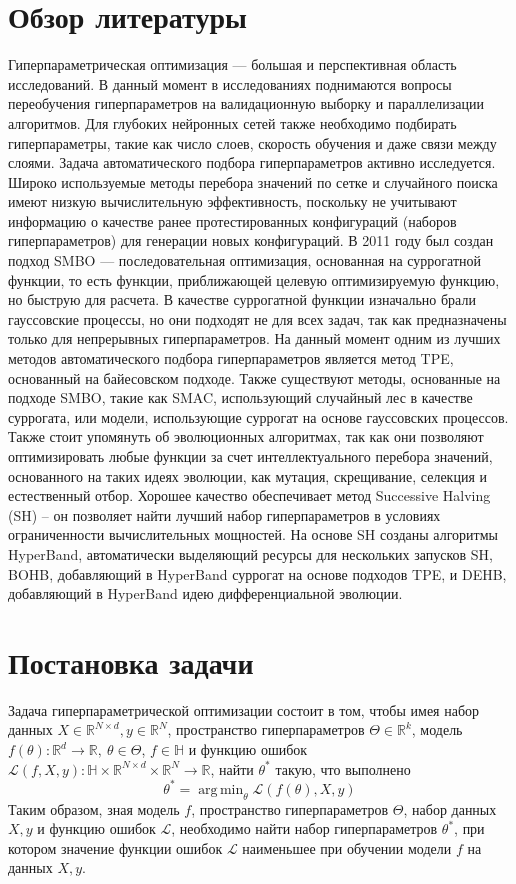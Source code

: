 \documentclass[a4paper,12pt]{article}
\DeclareMathOperator*{\argmin}{arg\,min}
\begin{document}
\section{Обзор литературы}

Гиперпараметрическая оптимизация — большая и перспективная область исследований. В данный момент в исследованиях поднимаются вопросы переобучения гиперпараметров на валидационную выборку и параллелизации алгоритмов. Для глубоких нейронных сетей также необходимо подбирать гиперпараметры, такие как число слоев, скорость обучения и даже связи между слоями.
Задача автоматического подбора гиперпараметров активно исследуется. Широко используемые методы перебора значений по сетке и случайного поиска имеют низкую вычислительную эффективность, поскольку не учитывают информацию о качестве ранее протестированных конфигураций (наборов гиперпараметров) для генерации новых конфигураций. В 2011 году был создан подход SMBO — последовательная оптимизация, основанная на суррогатной функции, то есть функции, приближающей целевую оптимизируемую функцию, но быструю для расчета. В качестве суррогатной функции изначально брали гауссовские процессы, но они подходят не для всех задач, так как предназначены только для непрерывных гиперпараметров. 
На данный момент одним из лучших методов автоматического подбора гиперпараметров является метод TPE, основанный на байесовском подходе. Также существуют методы, основанные на подходе SMBO, такие как SMAC, использующий случайный лес в качестве суррогата, или модели, использующие суррогат на основе гауссовских процессов. Также стоит упомянуть об эволюционных алгоритмах, так как они позволяют оптимизировать любые функции за счет интеллектуального перебора значений, основанного на таких идеях эволюции, как мутация, скрещивание, селекция и естественный отбор. Хорошее качество обеспечивает метод Successive Halving (SH)  – он позволяет найти лучший набор гиперпараметров в условиях ограниченности вычислительных мощностей. На основе SH созданы алгоритмы HyperBand, автоматически выделяющий ресурсы для нескольких запусков SH, BOHB, добавляющий в HyperBand суррогат на основе подходов TPE, и DEHB, добавляющий в HyperBand идею дифференциальной эволюции.

\section{Постановка задачи}
Задача гиперпараметрической оптимизации состоит в том, чтобы имея набор данных $X \in \mathbb{R}^{N\times d}, y \in \mathbb{R}^{N}$, пространство гиперпараметров $\Theta \in \mathbb{R}^k$, модель $f(\theta): \mathbb{R}^{d} \to \mathbb{R},\ \theta \in \Theta$, $f \in \mathbb{H}$ и функцию ошибок $\mathcal{L}(f, X, y): \mathbb{H} \times \mathbb{R}^{N\times d} \times \mathbb{R}^{N} \to \mathbb{R}$, найти $\theta^*$ такую, что выполнено
$$\theta^* = \argmin_{\theta} \mathcal{L}(f(\theta), X, y)$$
Таким образом, зная модель $f$, пространство гиперпараметров $\Theta$, набор данных $X, y$ и функцию ошибок $\mathcal{L}$, необходимо найти набор гиперпараметров $\theta^*$, при котором значение функции ошибок $\mathcal{L}$ наименьшее при обучении модели $f$ на данных $X, y$.
\end{document}
